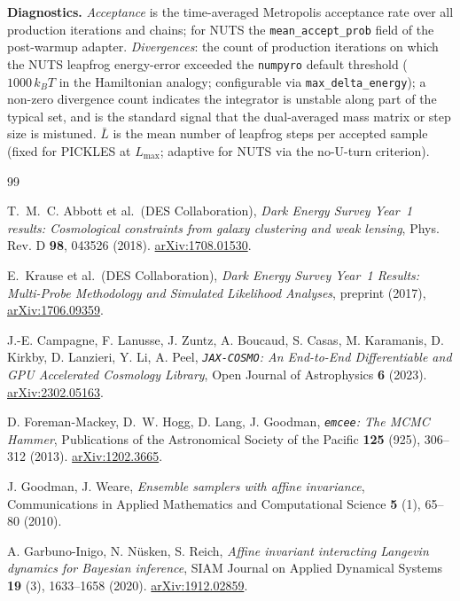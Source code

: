\documentclass{article}
\begin{document}
\textbf{Diagnostics.}  \emph{Acceptance} is the time-averaged Metropolis
acceptance rate over all production iterations and chains; for NUTS the
\texttt{mean\_accept\_prob} field of the post-warmup adapter.
\emph{Divergences}: the count of production iterations on which the NUTS
leapfrog energy-error exceeded the \texttt{numpyro} default threshold
($1000\,k_B T$ in the Hamiltonian analogy; configurable via
\texttt{max\_delta\_energy}); a non-zero divergence count indicates the
integrator is unstable along part of the typical set, and is the standard
signal that the dual-averaged mass matrix or step size is mistuned.
$\bar L$ is the mean number of leapfrog steps per accepted sample
(fixed for PICKLES at $L_{\max}$; adaptive for NUTS via the no-U-turn
criterion).

\begin{thebibliography}{99}

T.~M.~C. Abbott et al.\ (DES Collaboration),
\textit{Dark Energy Survey Year~1 results: Cosmological constraints from
galaxy clustering and weak lensing},
Phys. Rev. D \textbf{98}, 043526 (2018).
\href{https://arxiv.org/abs/1708.01530}{arXiv:1708.01530}.

E.~Krause et al.\ (DES Collaboration),
\textit{Dark Energy Survey Year~1 Results: Multi-Probe Methodology and
Simulated Likelihood Analyses},
preprint (2017),
\href{https://arxiv.org/abs/1706.09359}{arXiv:1706.09359}.

J.-E. Campagne, F. Lanusse, J. Zuntz, A. Boucaud, S. Casas,
M. Karamanis, D. Kirkby, D. Lanzieri, Y. Li, A. Peel,
\textit{\texttt{JAX-COSMO}: An End-to-End Differentiable and
GPU Accelerated Cosmology Library},
Open Journal of Astrophysics \textbf{6} (2023).
\href{https://arxiv.org/abs/2302.05163}{arXiv:2302.05163}.

D. Foreman-Mackey, D.~W. Hogg, D. Lang, J. Goodman,
\textit{\texttt{emcee}: The MCMC Hammer},
Publications of the Astronomical Society of the Pacific
\textbf{125} (925), 306--312 (2013).
\href{https://arxiv.org/abs/1202.3665}{arXiv:1202.3665}.

J. Goodman, J. Weare,
\textit{Ensemble samplers with affine invariance},
Communications in Applied Mathematics and Computational Science
\textbf{5} (1), 65--80 (2010).

A. Garbuno-Inigo, N. Nüsken, S. Reich,
\textit{Affine invariant interacting Langevin dynamics for Bayesian
inference},
SIAM Journal on Applied Dynamical Systems
\textbf{19} (3), 1633--1658 (2020).
\href{https://arxiv.org/abs/1912.02859}{arXiv:1912.02859}.


\end{thebibliography}
\end{document}
